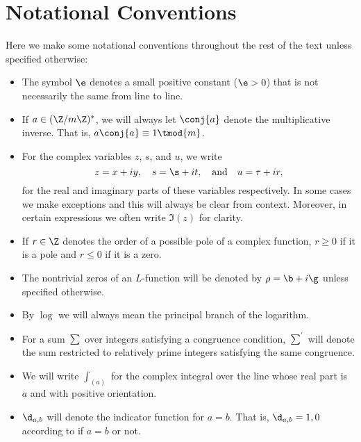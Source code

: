     \section{Notational Conventions}
      Here we make some notational conventions throughout the rest of the text unless specified otherwise:
      \begin{itemize}
        \item The symbol $\e$ denotes a small positive constant ($\e > 0$) that is not necessarily the same from line to line.
        \item If $a \in (\Z/m\Z)^{\ast}$, we will always let $\conj{a}$ denote the multiplicative inverse. That is, $a\conj{a} \equiv 1 \tmod{m}$.  
        \item For the complex variables $z$, $s$, and $u$, we write
        \[
          z = x+iy, \quad s = \s+it, \quad \text{and} \quad u = \tau+ir,
        \]
        for the real and imaginary parts of these variables respectively. In some cases we make exceptions and this will always be clear from context. Moreover, in certain expressions we often write $\Im(z)$ for clarity.
        \item If $r \in \Z$ denotes the order of a possible pole of a complex function, $r \ge 0$ if it is a pole and $r \le 0$ if it is a zero.
        \item The nontrivial zeros of an $L$-function will be denoted by $\rho = \b+i\g$ unless specified otherwise.
        \item By $\log$ we will always mean the principal branch of the logarithm.
        \item For a sum $\sum$ over integers satisfying a congruence condition, $\sum^{'}$ will denote the sum restricted to relatively prime integers satisfying the same congruence.
        \item We will write $\int_{(a)}$ for the complex integral over the line whose real part is $a$ and with positive orientation.
        \item $\d_{a,b}$ will denote the indicator function for $a = b$. That is, $\d_{a,b} = 1,0$ according to if $a = b$ or not.
      \end{itemize}

